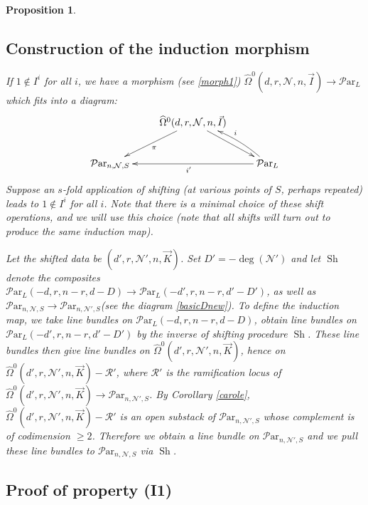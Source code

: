 \documentclass[11pt]{amsart}
\newcommand\op{\operatorname}
\newcommand\Sh{\operatorname{Sh}}
\newcommand\mn{\mathcal{N}}
\newcommand\ParL{\mathcal{P}\text{ar}_L}
\newcommand\Par{\mathcal{P}\text{ar} }
\newtheorem{proposition}[theorem]{Proposition}
\numberwithin{theorem}{subsection}
\begin{document}
{\begin{proposition}
\subsection{Construction of the induction morphism}
If $1\not\in I^i$ for all $i$, we have a morphism  (see \eqref{morph1}) $\widehat{\Omega}^0(d,r,\mn,n,\vec{I})\to \ParL$ which fits into a diagram:
\begin{equation}\label{Dbasic1.5}
\xymatrix{
 & \widehat{\Omega}^0(d,r,\mn,n,\vec{I})\ar[dl]^{\pi}\ar[dr]\\
\Par_{n,\mn,S}   &  & \ParL\ar@/_/[ul]_i\ar[ll]^{i'}
}
\end{equation}
Suppose an $s$-fold application of shifting (at various points of $S$, perhaps repeated) leads to $1\not\in I^i$ for all $i$. Note that there is a minimal choice of these shift operations, and we will use this choice (note that all shifts will turn out to produce the same induction map).

Let the shifted data be $(d',r,\mn',n,\vec{K})$. Set $D'=-\deg(\mn')$ and let $\op{Sh}$ denote the composites $\ParL(-d,r,n-r,d-D)\to \ParL(-d',r,n-r,d'-D')$, as well as $\Par_{n,\mn,S}\to \Par_{n,\mn',S}$(see the diagram \eqref{basicDnew}). To define the induction map, we take line bundles on  $\ParL(-d,r,n-r,d-D)$, obtain line bundles on $\ParL(-d',r,n-r,d'-D')$ by the inverse of shifting procedure $\Sh$. These line bundles then give line bundles on $\widehat{\Omega}^0(d',r,\mn',n,\vec{K})$, hence on $\widehat{\Omega}^0(d',r,\mn',n,\vec{K})-\mathcal{R}'$, where $\mathcal{R}'$ is the ramification locus of $\widehat{\Omega}^0(d',r,\mn',n,\vec{K})\to \Par_{n,\mn',S}$. By Corollary \ref{carole}, $\widehat{\Omega}^0(d',r,\mn',n,\vec{K})-\mathcal{R}'$ is an open substack of $\Par_{n,\mn',S}$ whose complement is of codimension $\geq 2$. Therefore we obtain a line bundle on
$\Par_{n,\mn',S}$  and we pull these line bundles to $\Par_{n,\mn,S}$ via $\Sh$.
\subsection{Proof of property (I1)}


\end{proposition}}
\end{document}
